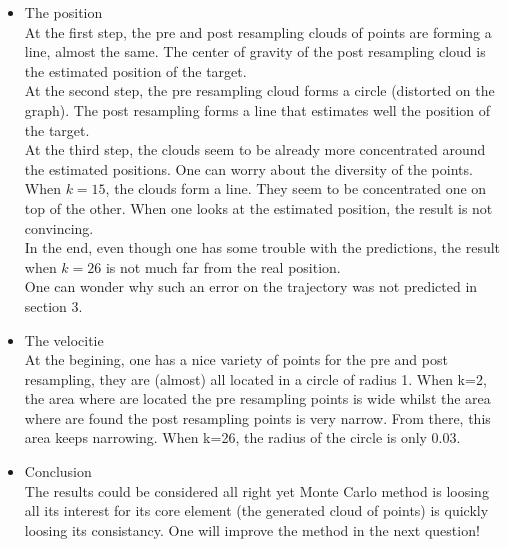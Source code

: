 \documentclass[english,DIV=13]{scrreprt}
\begin{document}
\begin{itemize}
\item The position\\
At the first step, the pre and post resampling clouds of points are forming a line, almost
the same. The center of gravity of the post resampling cloud is the estimated position
of the target.\\
At the second step, the pre resampling cloud forms a circle (distorted on the graph). 
The post resampling forms a line that estimates well the position of the target.\\
At the third step, the clouds seem to be already more concentrated around
the estimated positions. One can worry about the diversity of the points.\\
When $k=15$, the clouds form a line. They seem to be concentrated one
on top of the other. When one looks at the estimated position, the result
is not convincing. \\
In the end, even though one has some trouble with the predictions, the result
when $k=26$ is not much far from the real position.\\
One can wonder why such an error on the trajectory was not predicted in
section 3.

\item The velocitie\\
At the begining, one has a nice variety of points for the pre and post
resampling, they are (almost) all located in a circle of radius 1.
When k=2, the area where are located the pre resampling points is wide whilst
the area where are found the post resampling points is very narrow. From there, 
this area keeps narrowing. When k=26, the radius of the circle is only 0.03.

\item Conclusion\\
The results could be considered all right yet Monte Carlo method is loosing all its interest
for its core element (the generated cloud of points) is quickly loosing its
consistancy. One will improve the method in the next question!
\end{itemize} 
\end{document}

